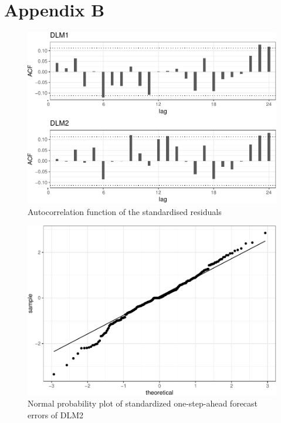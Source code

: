 \documentclass[12pt, a4paper]{article}
\begin{document}
\section*{Appendix B}\label{appendix-b}

\begin{figure}[H]
  \caption{\label{fig:residual-autocorr}Autocorrelation function of the
standardised residuals}
\centering
\includegraphics[scale = 0.8]{../figs/freq--residual-autocorr-1.pdf}
\end{figure}

\begin{figure}[H]
  \caption{\label{fig:qqnorm}Normal probability plot of standardized
one-step-ahead forecast errors of DLM2}
\centering
\includegraphics[scale = 0.8]{../figs/freq--qqnorm-1.pdf}
\end{figure}
\end{document}
